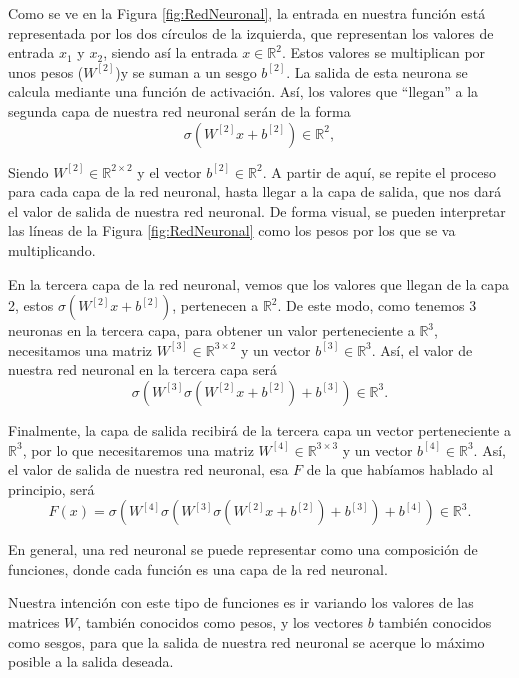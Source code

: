 \documentclass[a4paper,11pt,spanish, twoside, leqno]{tfg-uam}
\theoremstyle{definition}
\begin{document}
Como se ve en la Figura \ref{fig:RedNeuronal}, la entrada en nuestra función está representada por los dos círculos de la izquierda, que representan los valores de entrada $x_1$ y $x_2$, siendo así la entrada $x\in\mathbb{R}^2$. Estos valores se multiplican por unos pesos ($W^{[2]}$)y se suman a un sesgo $b^{[2]}$. La salida de esta neurona se calcula mediante una función de activación. Así, los valores que ``llegan'' a la segunda capa de nuestra red neuronal serán de la forma
\begin{equation*}
    \sigma(W^{[2]}x+b^{[2]})\in\mathbb{R}^2,
\end{equation*}

Siendo $W^{[2]}\in\mathbb{R}^{2\times2}$ y el vector $b^{[2]}\in\mathbb{R}^2$. A partir de aquí, se repite el proceso para cada capa de la red neuronal, hasta llegar a la capa de salida, que nos dará el valor de salida de nuestra red neuronal. De forma visual, se pueden interpretar las líneas de la Figura \ref{fig:RedNeuronal} como los pesos por los que se va multiplicando.

En la tercera capa de la red neuronal, vemos que los valores que llegan de la capa 2, estos $\sigma(W^{[2]}x+b^{[2]})$, pertenecen a $\mathbb{R}^2$. De este modo, como tenemos 3 neuronas en la tercera capa, para obtener un valor perteneciente a $\mathbb{R}^3$, necesitamos una matriz $W^{[3]}\in\mathbb{R}^{3\times2}$ y un vector $b^{[3]}\in\mathbb{R}^3$. Así, el valor de nuestra red neuronal en la tercera capa será
\begin{equation*}
    \sigma(W^{[3]}\sigma(W^{[2]}x+b^{[2]})+b^{[3]})\in\mathbb{R}^3.
\end{equation*}

Finalmente, la capa de salida recibirá de la tercera capa un vector perteneciente a $\mathbb{R}^3$, por lo que necesitaremos una matriz $W^{[4]}\in\mathbb{R}^{3\times3}$ y un vector $b^{[4]}\in\mathbb{R}^3$. Así, el valor de salida de nuestra red neuronal, esa $F$ de la que habíamos hablado al principio, será
\begin{equation}
    F(x)=\sigma(W^{[4]}\sigma(W^{[3]}\sigma(W^{[2]}x+b^{[2]})+b^{[3]})+b^{[4]})\in\mathbb{R}^3.
\end{equation}\label{eq:RedNeuronal}

En general, una red neuronal se puede representar como una composición de funciones, donde cada función es una capa de la red neuronal. 

Nuestra intención con este tipo de funciones es ir variando los valores de las matrices $W$, también conocidos como pesos, y los vectores $b$ también conocidos como sesgos, para que la salida de nuestra red neuronal se acerque lo máximo posible a la salida deseada. 
\end{document}
